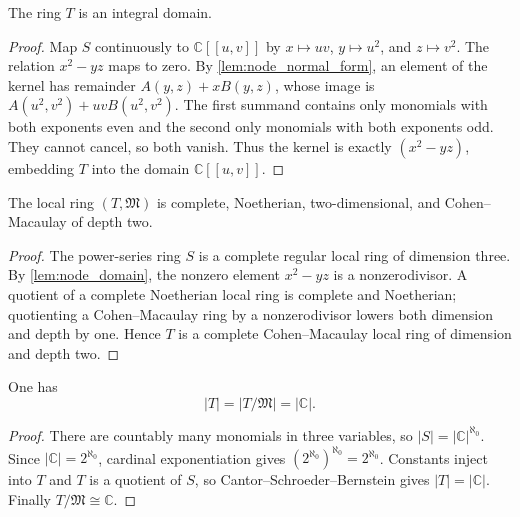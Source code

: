 \begin{lemma}
  \label{lem:node_domain}
  The ring \(T\) is an integral domain.
\end{lemma}

\begin{proof}
  Map \(S\) continuously to \(\mathbb C[[u,v]]\) by
  \(x\mapsto uv\), \(y\mapsto u^2\), and \(z\mapsto v^2\).
  The relation \(x^2-yz\) maps to zero.  By
  \cref{lem:node_normal_form}, an element of the kernel has remainder
  \(A(y,z)+xB(y,z)\), whose image is
  \(A(u^2,v^2)+uvB(u^2,v^2)\).  The first summand contains only monomials
  with both exponents even and the second only monomials with both exponents
  odd.  They cannot cancel, so both vanish.  Thus the kernel is exactly
  \((x^2-yz)\), embedding \(T\) into the domain \(\mathbb C[[u,v]]\).
\end{proof}

\begin{lemma}
  \label{lem:node_complete_cm_dim}
  The local ring \((T,\mathfrak M)\) is complete, Noetherian,
  two-dimensional, and Cohen--Macaulay of depth two.
\end{lemma}

\begin{proof}
  The power-series ring \(S\) is a complete regular local ring of dimension
  three.  By \cref{lem:node_domain}, the nonzero element \(x^2-yz\) is a
  nonzerodivisor.  A quotient of a complete Noetherian local ring is complete
  and Noetherian; quotienting a Cohen--Macaulay ring by a nonzerodivisor
  lowers both dimension and depth by one.  Hence \(T\) is a complete
  Cohen--Macaulay local ring of dimension and depth two.
\end{proof}

\begin{lemma}
  \label{lem:node_cardinality}
  One has
  \[
    |T|=|T/\mathfrak M|=|\mathbb C|.
  \]
\end{lemma}

\begin{proof}
  There are countably many monomials in three variables, so
  \(|S|=|\mathbb C|^{\aleph_0}\).  Since
  \(|\mathbb C|=2^{\aleph_0}\), cardinal exponentiation gives
  \((2^{\aleph_0})^{\aleph_0}=2^{\aleph_0}\).  Constants inject into \(T\)
  and \(T\) is a quotient of \(S\), so Cantor--Schroeder--Bernstein gives
  \(|T|=|\mathbb C|\).  Finally \(T/\mathfrak M\cong\mathbb C\).
\end{proof}

